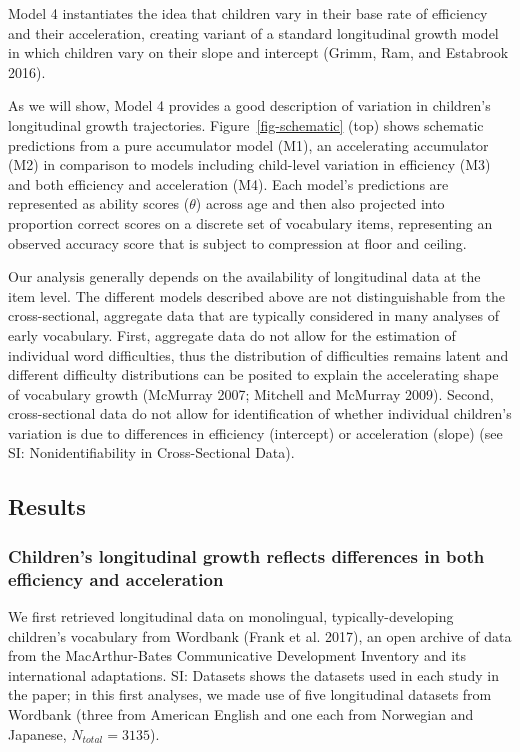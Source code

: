 \documentclass[
  11pt,
]{article}
\begin{document}
Model 4 instantiates the idea that children vary in their base rate of
efficiency and their acceleration, creating variant of a standard
longitudinal growth model in which children vary on their slope and
intercept (Grimm, Ram, and Estabrook 2016).

As we will show, Model 4 provides a good description of variation in
children's longitudinal growth trajectories. Figure~\ref{fig-schematic}
(top) shows schematic predictions from a pure accumulator model (M1), an
accelerating accumulator (M2) in comparison to models including
child-level variation in efficiency (M3) and both efficiency and
acceleration (M4). Each model's predictions are represented as ability
scores (\(\theta\)) across age and then also projected into proportion
correct scores on a discrete set of vocabulary items, representing an
observed accuracy score that is subject to compression at floor and
ceiling.

Our analysis generally depends on the availability of longitudinal data
at the item level. The different models described above are not
distinguishable from the cross-sectional, aggregate data that are
typically considered in many analyses of early vocabulary. First,
aggregate data do not allow for the estimation of individual word
difficulties, thus the distribution of difficulties remains latent and
different difficulty distributions can be posited to explain the
accelerating shape of vocabulary growth (McMurray 2007; Mitchell and
McMurray 2009). Second, cross-sectional data do not allow for
identification of whether individual children's variation is due to
differences in efficiency (intercept) or acceleration (slope) (see SI:
Nonidentifiability in Cross-Sectional Data).

\subsection{Results}\label{results}

\subsubsection{Children's longitudinal growth reflects differences in
both efficiency and
acceleration}\label{childrens-longitudinal-growth-reflects-differences-in-both-efficiency-and-acceleration}

We first retrieved longitudinal data on monolingual,
typically-developing children's vocabulary from Wordbank (Frank et al.
2017), an open archive of data from the MacArthur-Bates Communicative
Development Inventory and its international adaptations. SI: Datasets
shows the datasets used in each study in the paper; in this first
analyses, we made use of five longitudinal datasets from Wordbank (three
from American English and one each from Norwegian and Japanese,
\(N_{total} = 3135\)).
\end{document}
